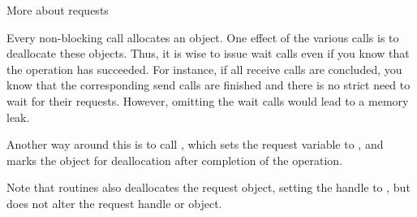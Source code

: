  {More about requests}

Every non-blocking call allocates an 
object. One effect of the various  calls is
to deallocate these objects. Thus, it is wise to issue wait calls even
if you know that the operation has succeeded. For instance, if all
receive calls are concluded, you know that the corresponding send
calls are finished and there is no strict need to wait for their
requests. However, omitting the wait calls would lead to a memory
leak.

Another way around this is to call ,
which sets the request variable to ,
and marks the object for deallocation after completion of the
operation.

Note that  routines also deallocates the
request object, setting the handle to ,
but  does not alter the request
handle or object.




